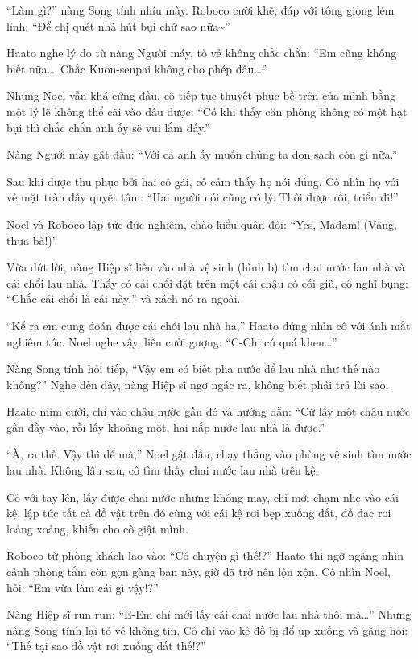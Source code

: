 \documentclass[../main.tex]{subfiles}
\begin{document}
``Làm gì?'' nàng Song tính nhíu mày. Roboco cười khẽ, đáp với tông giọng lém lỉnh: ``Để chị quét nhà hút bụi chứ sao nữa\~{}''

Haato nghe lý do từ nàng Người máy, tỏ vẻ không chắc chắn: ``Em cũng không biết nữa\dots\ Chắc Kuon-senpai không cho phép đâu\dots''

Nhưng Noel vẫn khá cứng đầu, cô tiếp tục thuyết phục bề trên của mình bằng một lý lẽ không thể cãi vào đâu được: ``Có khi thấy căn phòng không có một hạt bụi thì chắc chắn anh ấy sẽ vui lắm đấy.''

Nàng Người máy gật đầu: ``Với cả anh ấy muốn chúng ta dọn sạch còn gì nữa.''

Sau khi được thu phục bởi hai cô gái, cô cảm thấy họ nói đúng. Cô nhìn họ với vẻ mặt tràn đầy quyết tâm: ``Hai người nói cũng có lý. Thôi được rồi, triển đi!''

Noel và Roboco lập tức đức nghiêm, chào kiểu quân đội: ``Yes, Madam! (Vâng, thưa bà!)''

Vừa dứt lời, nàng Hiệp sĩ liền vào nhà vệ sinh (hình b) tìm chai nước lau nhà và cái chổi lau nhà. Thấy có cái chổi đặt trên một cái chậu có cối giũ, cô nghĩ bụng: ``Chắc cái chổi là cái này,'' và xách nó ra ngoài.

``Kể ra em cung đoán được cái chổi lau nhà ha,'' Haato đứng nhìn cô với ánh mắt nghiêm túc. Noel nghe vậy, liền cười gượng: ``C-Chị cứ quá khen\dots''

Nàng Song tính hỏi tiếp, ``Vậy em có biết pha nước để lau nhà như thế nào không?'' Nghe đến đây, nàng Hiệp sĩ ngơ ngác ra, không biết phải trả lời sao.

Haato mỉm cười, chỉ vào chậu nước gần đó và hướng dẫn: ``Cứ lấy một chậu nước gần đầy vào, rồi lấy khoảng một, hai nắp nước lau nhà là được.''

``À, ra thế. Vậy thì dễ mà,'' Noel gật đầu, chạy thẳng vào phòng vệ sinh tìm nước lau nhà. Không lâu sau, cô tìm thấy chai nước lau nhà trên kệ.

Cô với tay lên, lấy được chai nước nhưng không may, chỉ mới chạm nhẹ vào cái kệ, lập tức tất cả đồ vật trên đó cùng với cái kệ rơi bẹp xuống đất, đồ đạc rơi loảng xoảng, khiến cho cô giật mình.

Roboco từ phòng khách lao vào: ``Có chuyện gì thế!?'' Haato thì ngỡ ngàng nhìn cảnh phòng tắm còn gọn gàng ban nãy, giờ đã trở nên lộn xộn. Cô nhìn Noel, hỏi: ``Em vừa làm cái gì vậy!?''

Nàng Hiệp sĩ run run: ``E-Em chỉ mới lấy cái chai nước lau nhà thôi mà\dots'' Nhưng nàng Song tính lại tỏ vẻ không tin. Cô chỉ vào kệ đồ bị đổ ụp xuống và gặng hỏi: ``Thế tại sao đồ vật rơi xuống đất thế!?''
\end{document}
